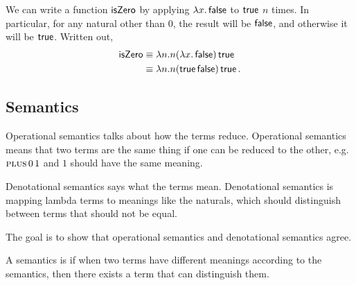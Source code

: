 \documentclass[class=scrartcl]{standalone}
\begin{document}
We can write a function \(\operatorname{\textsf{isZero}}\)
by applying \(\lambda x. \operatorname{\textsf{false}}\) to \(\operatorname{\textsf{true}}\) \(n\) times.
In particular, for any natural other than \(0\),
the result will be \(\operatorname{\textsf{false}}\),
and otherwise it will be \(\operatorname{\textsf{true}}\).
Written out,
\begin{align*}
  \operatorname{\textsf{isZero}} &\equiv \lambda n. n (\lambda x. \operatorname{\textsf{false}}) \operatorname{\textsf{true}} \\
                &\equiv \lambda n. n (\operatorname{\textsf{true}} \operatorname{\textsf{false}}) \operatorname{\textsf{true}}.
\end{align*}

\subsection{Semantics}

Operational semantics talks about how the terms reduce.
Operational semantics means that two terms are the same thing if
one can be reduced to the other,
e.g.\ \(\textsc{plus} \, 0 \, 1\) and \(1\) should have the same meaning.

Denotational semantics says what the terms mean.
Denotational semantics is mapping lambda terms to meanings like the naturals,
which should distinguish between terms that should not be equal.

The goal is to show that operational semantics
and denotational semantics agree.

A semantics is  if
when two terms have different meanings according to the semantics,
then there exists a term that can distinguish them.
\end{document}
